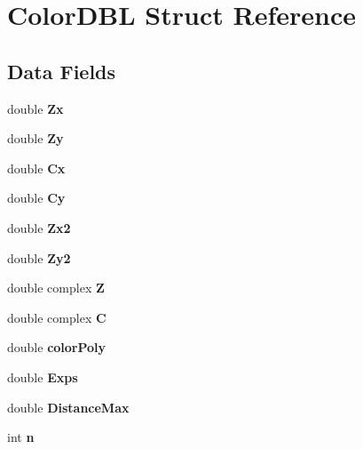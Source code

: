 \hypertarget{struct_color_d_b_l}{}\section{Color\+D\+BL Struct Reference}
\label{struct_color_d_b_l}
\subsection*{Data Fields}
\begin{DoxyCompactItemize}
\item 
\mbox{\label{struct_color_d_b_l_afc3882aafb004e9426d0672e7c01edaf}} 
double {\bfseries Zx}
\item 
\mbox{\label{struct_color_d_b_l_a295cfca80e80dc85e9ae1b13194a0287}} 
double {\bfseries Zy}
\item 
\mbox{\label{struct_color_d_b_l_a2a18d1e704fd3e7edd36e58aa1ad608e}} 
double {\bfseries Cx}
\item 
\mbox{\label{struct_color_d_b_l_a846fc0a4774b9a47d7dcc197aac61775}} 
double {\bfseries Cy}
\item 
\mbox{\label{struct_color_d_b_l_a6125ad69bdbe0f5e1d8e661c522ffe6f}} 
double {\bfseries Zx2}
\item 
\mbox{\label{struct_color_d_b_l_a0a80ad80b28ffc36cded142c1a1329a0}} 
double {\bfseries Zy2}
\item 
\mbox{\label{struct_color_d_b_l_a69a19813a90cb1464e4bc5ab26572e7d}} 
double complex {\bfseries Z}
\item 
\mbox{\label{struct_color_d_b_l_a262fa54396ee6189934c95444b663e08}} 
double complex {\bfseries C}
\item 
\mbox{\label{struct_color_d_b_l_a0036bac7853b4736d63df2c9ddd5415f}} 
double {\bfseries color\+Poly}
\item 
\mbox{\label{struct_color_d_b_l_ae15fca56fd7556c23cbe7c527989d4fb}} 
double {\bfseries Exps}
\item 
\mbox{\label{struct_color_d_b_l_a0dd11fac7a3243fae5357a010549c79b}} 
double {\bfseries Distance\+Max}
\item 
\mbox{\label{struct_color_d_b_l_a386d58a5189f753a7f74e3d7f250cf29}} 
int {\bfseries n}
\end{DoxyCompactItemize}


